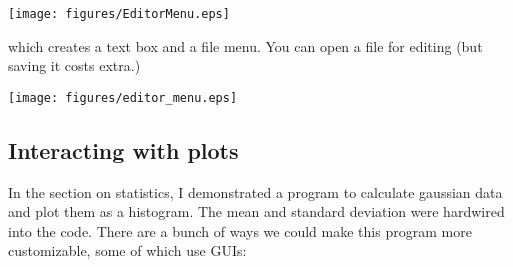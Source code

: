 {{%

\texttt{[image: figures/EditorMenu.eps]} 

\noindent which creates a text box and a file menu.  You can open a file for editing (but saving it costs extra.)

\texttt{[image: figures/editor\_menu.eps]} 


\subsection{Interacting with plots}

In the section on statistics, I demonstrated a program to calculate gaussian data and plot them as a histogram.  
The mean and standard deviation were hardwired into the code.  
There are a bunch of ways we could make this program more customizable, some of which use GUIs:

}}
